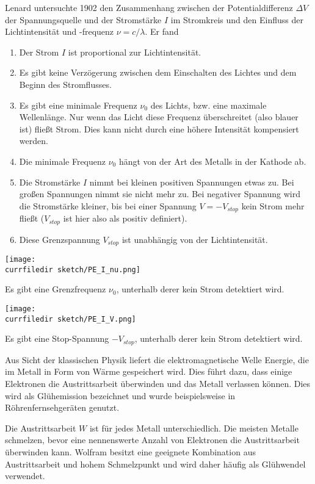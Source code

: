 Lenard untersuchte 1902 den Zusammenhang zwischen der Potentialdifferenz $\Delta V$ der Spannungsquelle und der Stromstärke $I$ im Stromkreis und den Einfluss der Lichtintensität und -frequenz $\nu = c / \lambda$. Er fand
\begin{enumerate}\setlength{\itemsep}{0pt}
    \item Der Strom $I$ ist proportional zur Lichtintensität.
    \item Es gibt keine Verzögerung zwischen dem Einschalten des Lichtes und dem Beginn des Stromflusses.
    \item Es gibt eine minimale Frequenz $\nu_0$ des Lichts, bzw. eine maximale Wellenlänge. Nur wenn das Licht diese Frequenz überschreitet (also blauer ist) fließt Strom. Dies kann nicht durch eine höhere Intensität kompensiert werden.
    \item Die minimale Frequenz $\nu_0$ hängt von der Art des Metalls in der Kathode ab.
    \item Die Stromstärke $I$ nimmt bei kleinen positiven Spannungen etwas zu. Bei großen Spannungen nimmt sie nicht mehr zu. Bei negativer Spannung wird die Stromstärke kleiner, bis bei einer Spannung $V = -V_{stop}$ kein Strom mehr fließt ($V_{stop}$ ist hier also als positiv definiert). 
    \item Diese Grenzspannung $V_{stop}$ ist unabhängig von der Lichtintensität. 
\end{enumerate}

\begin{marginfigure}
    \texttt{[image: \\currfiledir sketch/PE\_I\_nu.png]}
    \caption{Es gibt eine Grenzfrequenz $\nu_0$, unterhalb derer kein Strom detektiert wird.}
   \end{marginfigure}

   \begin{marginfigure}
    \texttt{[image: \\currfiledir sketch/PE\_I\_V.png]}
    \caption{Es gibt eine Stop-Spannung $- V_{stop}$,  unterhalb derer kein Strom detektiert wird.}
   \end{marginfigure}


Aus Sicht der klassischen Physik liefert die elektromagnetische Welle Energie, die im Metall in Form von Wärme gespeichert wird. Dies führt dazu, dass einige Elektronen die Austrittsarbeit überwinden und das Metall verlassen können. Dies wird als Glühemission bezeichnet und wurde beispielsweise in Röhrenfernsehgeräten genutzt.

Die Austrittsarbeit $W$ ist für jedes Metall unterschiedlich. Die meisten Metalle schmelzen, bevor eine nennenswerte Anzahl von Elektronen die Austrittsarbeit überwinden kann. Wolfram besitzt eine geeignete Kombination aus Austrittsarbeit und hohem Schmelzpunkt und wird daher häufig als Glühwendel verwendet.


